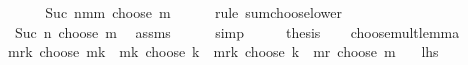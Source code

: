 \begin{isabellebody}
\ \ \isamarkupfalse%
\ \isamarkupfalse%
\ {\isachardoublequoteopen}{\isasymdots}\ {\isacharequal}{\kern0pt}\ Suc\ {\isacharparenleft}{\kern0pt}n{\isacharminus}{\kern0pt}m{\isacharplus}{\kern0pt}m{\isacharparenright}{\kern0pt}\ choose\ m{\isachardoublequoteclose}\isanewline
\ \ \ \ \isamarkupfalse%
\ {\isacharparenleft}{\kern0pt}rule\ sum{\isacharunderscore}{\kern0pt}choose{\isacharunderscore}{\kern0pt}lower{\isacharparenright}{\kern0pt}\isanewline
\ \ \isamarkupfalse%
\ \isamarkupfalse%
\ {\isachardoublequoteopen}{\isasymdots}\ {\isacharequal}{\kern0pt}\ Suc\ n\ choose\ m{\isachardoublequoteclose}\ \isamarkupfalse%
\ assms\isanewline
\ \ \ \ \isamarkupfalse%
\ simp\isanewline
\ \ \isamarkupfalse%
\ \isamarkupfalse%
\ {\isacharquery}{\kern0pt}thesis\ \isakeywordONE{{\isachardot}{\kern0pt}}\isamarkupfalse%
\ \isanewline
{}\isamarkupfalse%
%
\endisatagproof
{\isafoldproof}%
%
\isadelimproof
\isanewline
%
\endisadelimproof
\isanewline
{}\isamarkupfalse%
\ choose{\isacharunderscore}{\kern0pt}mult{\isacharunderscore}{\kern0pt}lemma{\isacharcolon}{\kern0pt}\isanewline
\ \ {\isachardoublequoteopen}{\isacharparenleft}{\kern0pt}{\isacharparenleft}{\kern0pt}m{\isacharplus}{\kern0pt}r{\isacharplus}{\kern0pt}k{\isacharparenright}{\kern0pt}\ choose\ {\isacharparenleft}{\kern0pt}m{\isacharplus}{\kern0pt}k{\isacharparenright}{\kern0pt}{\isacharparenright}{\kern0pt}\ {\isacharasterisk}{\kern0pt}\ {\isacharparenleft}{\kern0pt}{\isacharparenleft}{\kern0pt}m{\isacharplus}{\kern0pt}k{\isacharparenright}{\kern0pt}\ choose\ k{\isacharparenright}{\kern0pt}\ {\isacharequal}{\kern0pt}\ {\isacharparenleft}{\kern0pt}{\isacharparenleft}{\kern0pt}m{\isacharplus}{\kern0pt}r{\isacharplus}{\kern0pt}k{\isacharparenright}{\kern0pt}\ choose\ k{\isacharparenright}{\kern0pt}\ {\isacharasterisk}{\kern0pt}\ {\isacharparenleft}{\kern0pt}{\isacharparenleft}{\kern0pt}m{\isacharplus}{\kern0pt}r{\isacharparenright}{\kern0pt}\ choose\ m{\isacharparenright}{\kern0pt}{\isachardoublequoteclose}\isanewline
\ \ {\isacharparenleft}{\kern0pt}\ {\isachardoublequoteopen}{\isacharquery}{\kern0pt}lhs\ {\isacharequal}{\kern0pt}\ {\isacharunderscore}{\kern0pt}{\isachardoublequoteclose}{\isacharparenright}{\kern0pt}\isanewline
%
\isadelimproof
%
\endisadelimproof
%
\isatagproof
{}\isamarkupfalse%
\ {\isacharminus}{\kern0pt}\isanewline
\ \ \isamarkupfalse%

\end{isabellebody}
